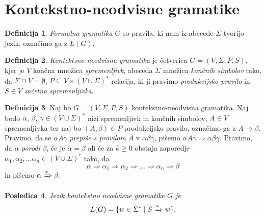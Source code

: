 \documentclass{amsart}
\theoremstyle{definition}
\newtheorem{definicija}{Definicija}[section]
\theoremstyle{plain} %
\newtheorem{posledica}[definicija]{Posledica}
\begin{document}
\section{Kontekstno-neodvisne gramatike}

\begin{definicija}

    \textit{Formalna gramatika} $ G $ so pravila, ki nam iz abecede $ \Sigma $ tvorijo jezik,
    označimo ga z $ L(G) $.

\end{definicija}

\begin{definicija}

    \textit{Kontektsno-neodvisna gramatika} je četverica $ G = ( V, \Sigma, P, S ) $, kjer je
    $ V $ končna množica \textit{spremenljivk}, abeceda $ \Sigma $ množica \textit{končnih simbolov} tako,
    da $ \Sigma \cap V = \emptyset $, $ P \subseteq V \times ( V \cup \Sigma )^* $ relacija, ki ji
    pravimo \textit{produkcijsko pravilo} in $ S \in V $ \textit{začetna spremenljivka}.

\end{definicija}

\begin{definicija}
    
    Naj bo $ G = ( V, \Sigma, P, S ) $ kontekstno-neodvisna gramatika. Naj bodo $ \alpha $,
    $ \beta $, $ \gamma \in ( V \cup \Sigma )^* $ nizi spremenljivk in končnih simbolov,
    $ A \in V $ spremenljivka ter naj bo $ ( A, \beta ) \in P $ produkcijsko pravilo,
    označimo ga z $ A \rightarrow \beta $. Pravimo, da se $ \alpha A \gamma $ 
    \textit{prepiše s pravilom} $ A $ v $ \alpha\beta\gamma $, pišemo $ \alpha A \gamma  \Rightarrow 
    \alpha\beta\gamma $. Pravimo, da $ \alpha $ \textit{porodi} $ \beta $, če je $ \alpha = \beta $ ali če
    za $ k \geq 0 $ obstaja zaporedje $ \alpha_1, \alpha_2, \ldots \alpha_n
    \in ( V \cup \Sigma )^* $ tako, da 
    \[
        \alpha \Rightarrow \alpha_1 \Rightarrow \alpha_2 \Rightarrow \ldots \Rightarrow \alpha_n
        \Rightarrow \beta
    \]
    in pišemo $ \alpha \xRightarrow{*} \beta $.

\end{definicija}

\begin{posledica}

    Jezik kontekstno neodvisne gramatike $ G $ je
    \[
        L(G) = \{ w \in \Sigma^* \mid S \xRightarrow{*} w \}.
    \]

\end{posledica}
\end{document}
